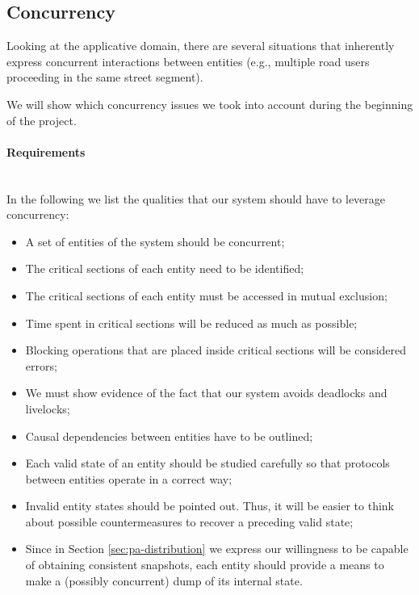 
\subsection{Concurrency}\label{sec:pa-concurrency}
Looking at the applicative domain, there are several situations that inherently
express concurrent interactions between entities (e.g., multiple road users
proceeding in the same street segment).

We will show which concurrency issues we took into account during the beginning
of the project.

\paragraph{Requirements} \mbox{} \\

In the following we list the qualities that our system should have to
leverage concurrency:

\begin{itemize}
\item A set of entities of the system should be concurrent;
\item The critical sections of each entity need to be identified;
\item The critical sections of each entity must be accessed in mutual
  exclusion;
\item Time spent in critical sections will be reduced as much as possible;
\item Blocking operations that are placed inside critical sections will be
  considered errors;
\item We must show evidence of the fact that our system avoids
  deadlocks and livelocks;
\item Causal dependencies between entities have to be outlined;
\item Each valid state of an entity should be studied carefully so that
  protocols between entities operate in a correct way;
\item Invalid entity states should be pointed out. Thus, it will be easier to
  think about possible countermeasures to recover a preceding valid state;
\item Since in Section \ref{sec:pa-distribution} we express our willingness to
  be capable of obtaining consistent snapshots, each entity should provide a
  means to make a (possibly concurrent) dump of its internal state.
\end{itemize}

